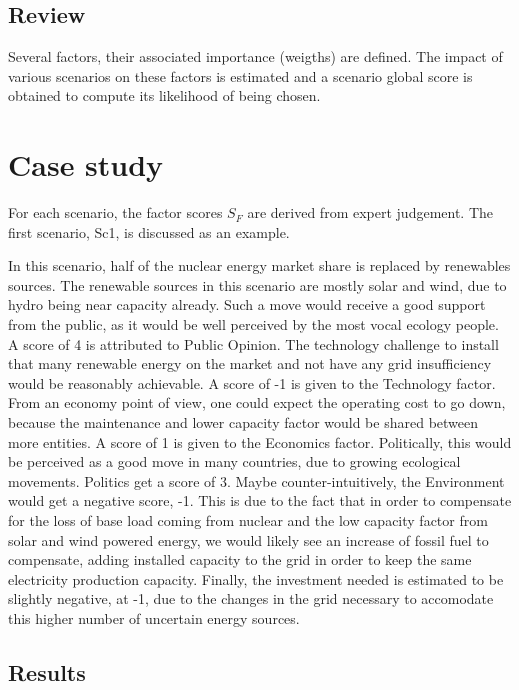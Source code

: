 \documentclass[IJPHM, 2017, 29]{PHMSociety}
\begin{document}
\subsection{Review}

Several factors, their associated importance (weigths) are defined. The impact of various scenarios on these factors is estimated and a scenario global score is obtained to compute its likelihood of being chosen.

\section{Case study}
\label{sec:study}

For each scenario, the factor scores $S_F$ are derived from expert judgement. The first scenario, Sc1, is discussed as an example.

In this scenario, half of the nuclear energy market share is replaced by renewables sources. The renewable sources in this scenario are mostly solar and wind, due to hydro being near capacity already. Such a move would receive a good support from the public, as it would be well perceived by the most vocal ecology people. A score of 4 is attributed to Public Opinion. The technology challenge to install that many renewable energy on the market and not have any grid insufficiency would be reasonably achievable. A score of -1 is given to the Technology factor. From an economy point of view, one could expect the operating cost to go down, because the maintenance and lower capacity factor would be shared between more entities. A score of 1 is given to the Economics factor. Politically, this would be perceived as a good move in many countries, due to growing ecological movements. Politics get a score of 3. Maybe counter-intuitively, the Environment would get a negative score, -1. This is due to the fact that in order to compensate for the loss of base load coming from nuclear and the low capacity factor from solar and wind powered energy, we would likely see an increase of fossil fuel to compensate, adding installed capacity to the grid in order to keep the same electricity production capacity. Finally, the investment needed is estimated to be slightly negative, at -1, due to the changes in the grid necessary to accomodate this higher number of uncertain energy sources.


\subsection{Results}
\end{document}
